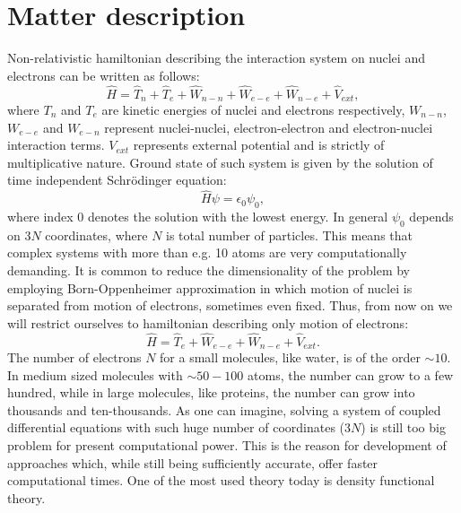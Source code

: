 \message{ !name(document.tex)}\documentclass[openany, longbibliography,slovene,a4paper,12pt]{article}
\begin{document}
\section{Matter description}
Non-relativistic hamiltonian describing the interaction system on nuclei and electrons can be
written as follows:
\begin{equation} \label{full_hamiltonian}
\hat H= \hat T_n + \hat  T_e + \hat  W_{n-n} + \hat W_{e-e} + \hat W_{n-e} + \hat V_{ext},
\end{equation}
where $T_n$ and $T_e$ are kinetic energies of nuclei and electrons respectively,
$W_{n-n}$, $W_{e-e}$ and $W_{e-n}$ represent  nuclei-nuclei, electron-electron
and electron-nuclei interaction terms. $V_{ext}$ represents external potential
and is strictly of multiplicative nature.  Ground state of such system is given by the solution of time independent Schr{\"o}dinger equation:
\begin{equation} \label{ham_solution}
\hat H \psi = \epsilon_0 \psi_0,
\end{equation} 
where index $0$ denotes the solution with the lowest energy. In general $\psi_0$
depends on $3N$ coordinates, where $N$ is total number of particles. This means
that complex systems with more than e.g. 10 atoms are very computationally
demanding. It is common to reduce the dimensionality of the problem by employing
Born-Oppenheimer approximation in which motion of nuclei is separated from
motion of electrons, sometimes even fixed. Thus, from now on we will restrict
ourselves to hamiltonian describing only motion of electrons:
\begin{equation} \label{electron_hamiltonian}
\hat H=  \hat  T_e  + \hat W_{e-e} + \hat W_{n-e} + \hat V_{ext}.
\end{equation}
The number of electrons $N$ for a small molecules, like water, is of the order $\sim
10$. In medium sized molecules with $\sim 50-100$ atoms, the number can grow to a few
hundred, while in large molecules, like proteins, the number can grow into
thousands and ten-thousands. As one can imagine, solving a system of coupled differential equations
with such huge number of coordinates ($3N$) is still too big problem for present
computational power. This is the reason for development of approaches which,
while still being sufficiently accurate, offer faster computational times. One
of the most used theory today is density functional theory.
\end{document}
